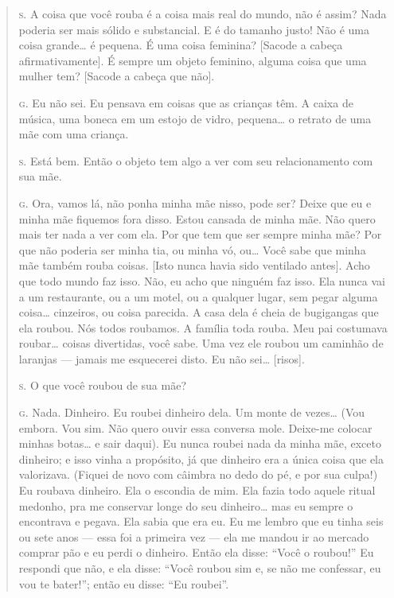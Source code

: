 \begin{quote}

\noindent\hskip0mm\textsc{s.} A coisa que você rouba é a coisa mais real do mundo, não é assim?
Nada poderia ser mais sólido e substancial. E é do tamanho justo! Não é
uma coisa grande\ldots{} é pequena. É uma coisa feminina? [Sacode a cabeça
afirmativamente]. É sempre um objeto feminino, alguma coisa que uma
mulher tem? [Sacode a cabeça que não].

\noindent\hskip0mm\textsc{g.} Eu não sei. Eu pensava em coisas que as crianças têm. A caixa de
música, uma boneca em um estojo de vidro, pequena\ldots{} o retrato de uma
mãe com uma criança.

\noindent\hskip0mm\textsc{s.} Está bem. Então o objeto tem algo a ver com seu relacionamento com
sua mãe.

\noindent\hskip0mm\textsc{g.} Ora, vamos lá, não ponha minha mãe nisso, pode ser? Deixe que eu e
minha mãe fiquemos fora disso. Estou cansada de minha mãe. Não quero
mais ter nada a ver com ela. Por que tem que ser sempre minha mãe? Por
que não poderia ser minha tia, ou minha vó, ou\ldots{} Você sabe que minha
mãe também rouba coisas. [Isto nunca havia sido ventilado antes]. Acho
que todo mundo faz isso. Não, eu acho que ninguém faz isso. Ela nunca
vai a um restaurante, ou a um motel, ou a qualquer lugar, sem pegar
alguma coisa\ldots{} cinzeiros, ou coisa parecida. A casa dela é cheia de
bugigangas que ela roubou. Nós todos roubamos. A família toda rouba.
Meu pai costumava roubar\ldots{} coisas divertidas, você sabe. Uma vez ele
roubou um caminhão de laranjas --- jamais me esquecerei disto. Eu não
sei\ldots{} [risos].

\noindent\hskip0mm\textsc{s.} O que você roubou de sua mãe?

\noindent\hskip0mm\textsc{g.} Nada. Dinheiro. Eu roubei dinheiro dela. Um monte de vezes\ldots{} (Vou
embora. Vou sim. Não quero ouvir essa conversa mole. Deixe-me colocar
minhas botas\ldots{} e sair daqui). Eu nunca roubei nada da minha mãe,
exceto dinheiro; e isso vinha a propósito, já que dinheiro era a única
coisa que ela valorizava. (Fiquei de novo com câimbra no dedo do pé, e
por sua culpa!) Eu roubava dinheiro. Ela o escondia de mim. Ela fazia
todo aquele ritual medonho, pra me conservar longe do seu dinheiro\ldots{}
mas eu sempre o encontrava e pegava. Ela sabia que era eu. Eu me lembro
que eu tinha seis ou sete anos --- essa foi a primeira vez --- ela me
mandou ir ao mercado comprar pão e eu perdi o dinheiro. Então ela
disse: ``Você o roubou!'' Eu respondi que
não, e ela disse: ``Você roubou sim e, se não me
confessar, eu vou te bater!''; então eu disse:
``Eu roubei''.


\end{quote}
